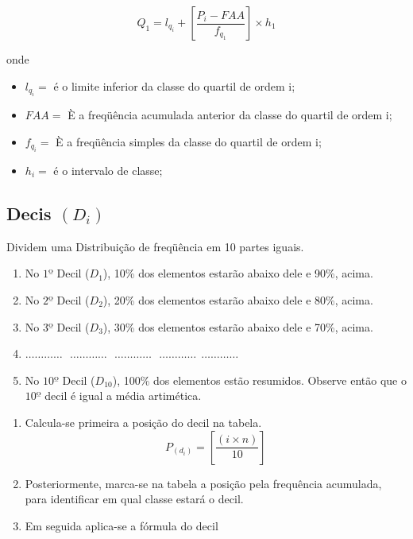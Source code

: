 \begin{equation}\label{}
    Q_{1}= l_{q_{i}}+\left[\frac{P_{i}-FAA}{f_{q_{1}}}\right]\times h_{1}
\end{equation}

 onde

 \begin{itemize}
   \item $l_{q_{i}}=$ é o limite inferior da classe do quartil de ordem i;
   \item $FAA=$ È a freqüência acumulada anterior da classe do quartil de ordem i;
   \item $f_{q_{i}}=$ È a freqüência simples da classe do quartil de ordem i;
   \item $h_{i}=$ é o intervalo de classe;
 \end{itemize}




\subsection{Decis $(D_{i})$}

Dividem uma Distribuição de freqüência em 10 partes iguais.


\begin{enumerate}
  \item[{1)}] No $1º$ Decil ($D_{1}$), 10\% dos elementos estarão abaixo dele e 90\%, acima.
  \item[{2)}] No $2º$ Decil ($D_{2}$), 20\% dos elementos estarão abaixo dele e 80\%, acima.
  \item[{3)}] No $3º$ Decil ($D_{3}$), 30\% dos elementos estarão abaixo dele e 70\%, acima.
  \item[{4)}] $\ldots \ldots \ldots \ldots \ \ \  \ldots \ldots \ldots \ldots \ \ \  \ldots \ldots \ldots \ldots \ \ \  \ldots \ldots \ldots \ldots \ \ \ldots \ldots \ldots \ldots$
 \item[{5)}] No $10º$ Decil ($D_{10}$), 100\% dos elementos estão resumidos. Observe então que o $10º$ decil é igual a média artimética.
\end{enumerate}

\begin{enumerate}
\item [{1)}]Calcula-se primeira a posição do decil na tabela.
$$ P_{(d_{i})} = \left[ \frac{(i \times n)}{10} \right] $$
\item [{2)}] Posteriormente, marca-se na tabela a posição pela frequência acumulada, para identificar em qual classe estará o decil.
\item [{3)}] Em seguida aplica-se a fórmula do decil
\end{enumerate}

